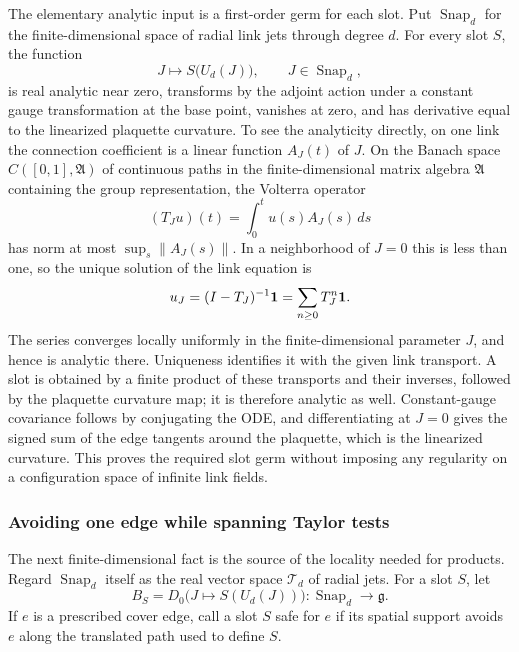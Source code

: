 The elementary analytic input is a first-order germ for each slot. Put
$\operatorname{Snap}_d$ for the finite-dimensional space of radial link
jets through degree $d$. For every slot $S$, the function
\[
          J\longmapsto S\bigl(U_d(J)\bigr),\qquad J\in\operatorname{Snap}_d,
\]
is real analytic near zero, transforms by the adjoint action under a
constant gauge transformation at the base point, vanishes at zero, and
has derivative equal to the linearized plaquette curvature. To see the
analyticity directly, on one link the connection coefficient is a linear
function $A_J(t)$ of $J$. On the Banach space $C([0,1],\mathfrak A)$ of
continuous paths in the finite-dimensional matrix algebra $\mathfrak A$
containing the group representation, the Volterra operator
\[
          (T_Ju)(t)=\int_0^t u(s)A_J(s)\,ds
\]
has norm at most $\sup_s\|A_J(s)\|$. In a neighborhood of $J=0$ this is
less than one, so the unique solution of the link equation is
\[
                 u_J=(I-T_J)^{-1}{\bf 1}
                     =\sum_{n\geq0}T_J^n{\bf 1}.
\]
The series converges locally uniformly in the finite-dimensional parameter
$J$, and hence is analytic there. Uniqueness identifies it with the given
link transport. A slot is obtained by a finite product of these transports
and their inverses, followed by the plaquette curvature map; it is therefore
analytic as well. Constant-gauge covariance follows by conjugating the ODE,
and differentiating at $J=0$ gives the signed sum of the edge tangents around
the plaquette, which is the linearized curvature. This proves the required
slot germ without imposing any regularity on a configuration space of
infinite link fields.

\subsubsection{Avoiding one edge while spanning Taylor tests}

The next finite-dimensional fact is the source of the locality needed for
products. Regard $\operatorname{Snap}_d$ itself as the real vector space
$\mathcal T_d$ of radial jets. For a slot $S$, let
\[
       B_S=D_0\bigl(J\mapsto S(U_d(J))\bigr):
                  \operatorname{Snap}_d\to\mathfrak g.
\]
If $e$ is a prescribed cover edge, call a slot $S$ safe for $e$ if its
spatial support avoids $e$ along the translated path used to define $S$.

